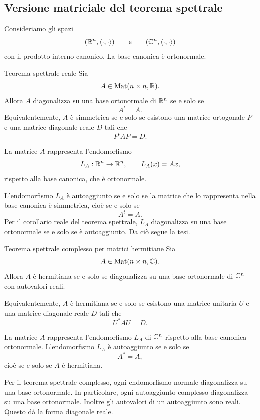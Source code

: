 \documentclass[a4paper]{article}
\begin{document}
\subsection{Versione matriciale del teorema spettrale}

Consideriamo gli spazi
\[
    (\mathbb{R}^n,\langle\cdot,\cdot\rangle)
    \qquad
    \text{e}
    \qquad
    (\mathbb{C}^n,\langle\cdot,\cdot\rangle)
\]
con il prodotto interno canonico. La base canonica è ortonormale.

\begin{snippettheorem}{Teorema spettrale reale}
    Sia
    \[
        A\in\operatorname{Mat}(n\times n,\mathbb{R}).
    \]
    Allora \(A\) diagonalizza su una base ortonormale di \(\mathbb{R}^n\) se e solo se
    \[
        A^t=A.
    \]
    Equivalentemente, \(A\) è simmetrica se e solo se esistono una matrice ortogonale \(P\) e una matrice diagonale reale \(D\) tali che
    \[
        P^tAP=D.
    \]
\end{snippettheorem}

\begin{snippetproof}{}
    La matrice \(A\) rappresenta l'endomorfismo
    \[
        L_A:\mathbb{R}^n\to\mathbb{R}^n,
        \qquad
        L_A(x)=Ax,
    \]
    rispetto alla base canonica, che è ortonormale.

    L'endomorfismo \(L_A\) è autoaggiunto se e solo se la matrice che lo rappresenta nella base canonica è simmetrica, cioè se e solo se
    \[
        A^t=A.
    \]
    Per il corollario reale del teorema spettrale, \(L_A\) diagonalizza su una base ortonormale se e solo se è autoaggiunto. Da ciò segue la tesi.
\end{snippetproof}

\begin{snippettheorem}{Teorema spettrale complesso per matrici hermitiane}
    Sia
    \[
        A\in\operatorname{Mat}(n\times n,\mathbb{C}).
    \]
    Allora \(A\) è hermitiana se e solo se diagonalizza su una base ortonormale di \(\mathbb{C}^n\) con autovalori reali.

    Equivalentemente, \(A\) è hermitiana se e solo se esistono una matrice unitaria \(U\) e una matrice diagonale reale \(D\) tali che
    \[
        U^*AU=D.
    \]
\end{snippettheorem}

\begin{snippetproof}{}
    La matrice \(A\) rappresenta l'endomorfismo \(L_A\) di \(\mathbb{C}^n\) rispetto alla base canonica ortonormale. L'endomorfismo \(L_A\) è autoaggiunto se e solo se
    \[
        A^*=A,
    \]
    cioè se e solo se \(A\) è hermitiana.

    Per il teorema spettrale complesso, ogni endomorfismo normale diagonalizza su una base ortonormale. In particolare, ogni autoaggiunto complesso diagonalizza su una base ortonormale. Inoltre gli autovalori di un autoaggiunto sono reali. Questo dà la forma diagonale reale.
\end{snippetproof}
\end{document}
